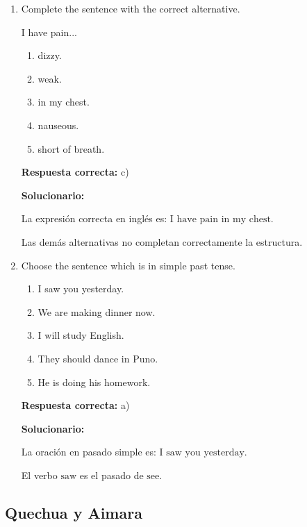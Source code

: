 \begin{enumerate}[resume]
	
	
	\item Complete the sentence with the correct alternative.
	
	I have pain...
	\begin{enumerate}[label=\alph*)]
		\item dizzy.
		\item weak.
		\item in my chest.
		\item nauseous.
		\item short of breath.
	\end{enumerate}
	\textbf{Respuesta correcta:} c)
	
	\vspace{2mm}
	\textbf{Solucionario:}
	
	La expresión correcta en inglés es:
	$ \text{I have pain in my chest.} $
	
	Las demás alternativas no completan correctamente la estructura.
	
	\vspace{6mm}
	
	\item Choose the sentence which is in simple past tense.
	\begin{enumerate}[label=\alph*)]
		\item I saw you yesterday.
		\item We are making dinner now.
		\item I will study English.
		\item They should dance in Puno.
		\item He is doing his homework.
	\end{enumerate}
	\textbf{Respuesta correcta:} a)
	
	\vspace{2mm}
	\textbf{Solucionario:}
	
	La oración en pasado simple es:
	$ \text{I saw you yesterday.} $
	
	El verbo $ \text{saw} $ es el pasado de $ \text{see} $.
	
	\vspace{6mm}
	
\end{enumerate}

\subsection*{Quechua y Aimara}

